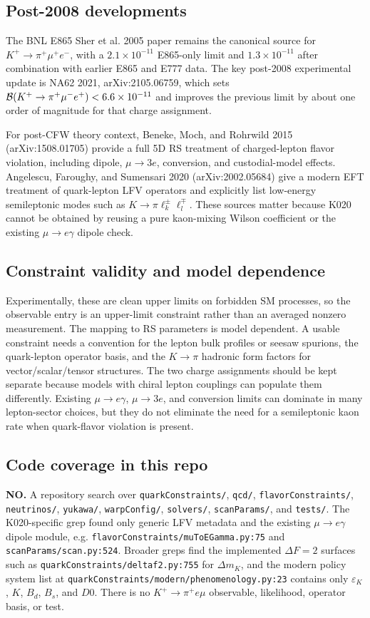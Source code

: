 \subsection*{Post-2008 developments}
The BNL E865 Sher et al. 2005 paper remains the canonical source for
\(K^+\to\pi^+\mu^+e^-\), with a \(2.1\times10^{-11}\) E865-only limit and
\(1.3\times10^{-11}\) after combination with earlier E865 and E777 data.
The key post-2008 experimental update is NA62 2021, arXiv:2105.06759, which
sets \({\cal B}(K^+\to\pi^+\mu^-e^+)<6.6\times10^{-11}\) and improves the
previous limit by about one order of magnitude for that charge assignment.

For post-CFW theory context, Beneke, Moch, and Rohrwild 2015
(arXiv:1508.01705) provide a full 5D RS treatment of charged-lepton flavor
violation, including dipole, \(\mu\to3e\), conversion, and custodial-model
effects.  Angelescu, Faroughy, and Sumensari 2020 (arXiv:2002.05684) give a
modern EFT treatment of quark-lepton LFV operators and explicitly list
low-energy semileptonic modes such as
\(K\to\pi \ell_k^\pm\ell_l^\mp\).  These sources matter because K020 cannot be
obtained by reusing a pure kaon-mixing Wilson coefficient or the existing
\(\mu\to e\gamma\) dipole check.

\subsection*{Constraint validity and model dependence}
Experimentally, these are clean upper limits on forbidden SM processes, so the
observable entry is an upper-limit constraint rather than an averaged
nonzero measurement.  The mapping to RS parameters is model dependent.  A
usable constraint needs a convention for the lepton bulk profiles or seesaw
spurions, the quark-lepton operator basis, and the \(K\to\pi\) hadronic form
factors for vector/scalar/tensor structures.  The two charge assignments should
be kept separate because models with chiral lepton couplings can populate them
differently.  Existing \(\mu\to e\gamma\), \(\mu\to3e\), and conversion limits
can dominate in many lepton-sector choices, but they do not eliminate the need
for a semileptonic kaon rate when quark-flavor violation is present.

\subsection*{Code coverage in this repo}
\textbf{NO.}  A repository search over \texttt{quarkConstraints/}, \texttt{qcd/},
\texttt{flavorConstraints/}, \texttt{neutrinos/}, \texttt{yukawa/},
\texttt{warpConfig/}, \texttt{solvers/}, \texttt{scanParams/}, and
\texttt{tests/}.  The K020-specific grep found only generic LFV metadata and
the existing \(\mu\to e\gamma\) dipole module, e.g.
\texttt{flavorConstraints/muToEGamma.py:75} and
\texttt{scanParams/scan.py:524}.  Broader greps find the implemented
\(\Delta F=2\) surfaces such as \texttt{quarkConstraints/deltaf2.py:755} for
\(\Delta m_K\), and the modern policy system list at
\texttt{quarkConstraints/modern/phenomenology.py:23} contains only
\(\varepsilon_K\), \(K\), \(B_d\), \(B_s\), and \(D0\).  There is no
\(K^+\to\pi^+e\mu\) observable, likelihood, operator basis, or test.

